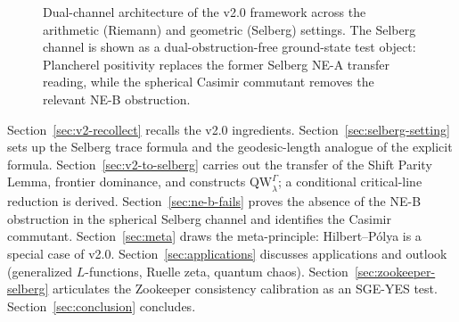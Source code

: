 \documentclass[12pt,a4paper]{article}
\theoremstyle{definition}
\theoremstyle{remark}
\newcommand{\HH}{\mathbb{H}}
\newcommand{\QW}{\mathrm{QW}}
\newcommand{\Sel}{Z_{\Gamma}}
\begin{document}
\begin{figure}[htbp]
{%
}
\caption{Dual-channel architecture of the v2.0 framework across the arithmetic (Riemann) and geometric (Selberg) settings. The Selberg channel is shown as a dual-obstruction-free ground-state test object: Plancherel positivity replaces the former Selberg NE-A transfer reading, while the spherical Casimir commutant removes the relevant NE-B obstruction.}
\label{fig:v2-transfer-architecture}
\end{figure}

Section~\ref{sec:v2-recollect} recalls the v2.0 ingredients.
Section~\ref{sec:selberg-setting} sets up the Selberg trace formula and the
geodesic-length analogue of the explicit formula.
Section~\ref{sec:v2-to-selberg} carries out the transfer of the Shift Parity
Lemma, frontier dominance, and constructs $\QW^\Gamma_\lambda$; a conditional
critical-line reduction is derived.
Section~\ref{sec:ne-b-fails} proves the absence of the NE-B obstruction in
the spherical Selberg channel and identifies the Casimir commutant.
Section~\ref{sec:meta} draws the meta-principle: Hilbert--Pólya is a
special case of v2.0.
Section~\ref{sec:applications} discusses applications and outlook
(generalized $L$-functions, Ruelle zeta, quantum chaos).
Section~\ref{sec:zookeeper-selberg} articulates the Zookeeper consistency calibration as an SGE-YES test.
Section~\ref{sec:conclusion} concludes.
\end{document}
